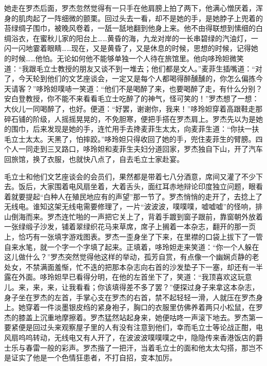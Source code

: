 \par 她走在罗杰后面，罗杰忽然觉得有一只手在他肩膀上拍了两下，他满心憎厌着，浑身的肌肉起了一阵细微的颤栗。回过头去一看，却不是她的手，是她脖子上兜着的苔绿绸子围巾，被晚风卷着，一舐一舐地翻到他身上来。他不由得联想到愫细的白绸浴衣，在蜜秋儿家的阳台上……黄昏的海，九龙对岸的一长串碧绿的汽油灯，一闪一闪地霎着眼睛……现在，又是黄昏了，又是休息的时候，思想的时候，记得她的时候……他怕。无论如何他不能够单独一个人待在旅馆里。他向哆玲妲微笑道：“我跟毛立士教授的朋友又谈不到一堆去；他们都是文人。”麦菲生插嘴道：“对了，今天轮到他们的文艺座谈会，一定又是每个人都喝得醉醺醺的，你怎么偏拣今天请客？”哆玲妲噗哧一笑道：“他们不是喝醉了来，也要喝醉了走，有什么分别？安白登教授，你不能不来看看毛立士吃醉了的神气，怪可笑的！”罗杰想了一想：大伙儿一同喝醉了，也好。便道：“好罢，谢谢你，我来！”哆玲妲穿着高跟鞋走那碎石铺的阶级，人摇摇晃晃的，不免胆寒，便把手搭在罗杰肩上。罗杰先以为是她的围巾，后来发现是她的手，连忙用手去搀麦菲生太太，向麦菲生道：“你扶一扶毛立士太太。天黑了，怕摔跤。”哆玲妲只得收回了她的手，兜住麦菲生的臂膀。四个人一同走到三叉路口，哆玲妲和麦菲生夫妇分道回家，罗杰独自下山，开了汽车回旅馆，换了衣服，也就快八点了，自去毛立士家赴宴。
\par 毛立士和他们文艺座谈会的会员们，果然都是带着七八分酒意，席间又灌了不少下去。饭后，大家围着电风扇坐着，大着舌头，面红耳赤地辩论印度独立问题，眼看着就要提起“白种人在殖民地应有的声望”那一节了。罗杰悄悄的走开了，去捻上了无线电。谁知这架无线电需要修理了，一片“波波波，噗噗噗，嘘嘘嘘”的怪响，排山倒海而来。罗杰连忙啪的一声把它关上了，背着手踱到窗子跟前，靠窗朝外放着一张绿缎子沙发，铺着翠绿织花马来草席，席子上搁着一本杂志，翻开的那一页上，恰巧有一张填字游戏图表。罗杰一歪身坐了下来，在里襟的口袋上拔下了一管自来水笔，就一个字一个字填了起来。正填着，哆玲妲走来笑道：“你一个人躲在这儿做什么？”罗杰突然觉得他这样的举动，孤芳自赏，有点像一个幽娴贞静的老处女，不禁满面羞惭，忙不迭的把那本杂志向右首的沙发垫子下一塞，却还有一半露在外面。哆玲妲早已看得分明，在他的左首坐下了，笑道：“我顶喜欢这玩意儿。来，来，来，让我看看；你该填得差不多了罢？”便探过身子来拿这本杂志，身子坐在罗杰的左首，手掌心支在罗杰的右首，禁不起轻轻一滑，人就压在罗杰身上。她穿着一件淡墨银皮绉的紧身袍子，胸口的衣服里仿佛养着两只小松鼠，在罗杰的膝盖上沉重地摩擦着。罗杰猛然站起身来，她便咕咚一声滚下地去。罗杰第一要紧便是回过头来观察屋子里的人有没有注意到他们，幸而毛立士等论战正酣，电风扇呜呜转动，无线电又有人开了，在波波波噗噗噗之中，隐隐传来香港饭店的爵士乐与春雷一般的彩声。罗杰揩了一把汗，当着毛立士的面和他太太勾搭，那岂不是证实了他是一个色情狂患者，不打自招，变本加厉。
